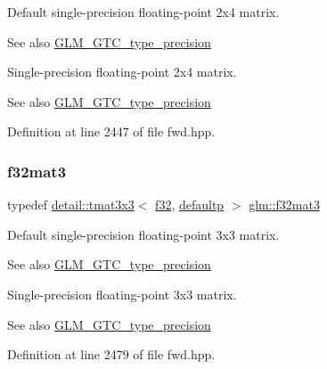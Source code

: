 Default single-\/precision floating-\/point 2x4 matrix. \begin{DoxySeeAlso}{See also}
\hyperlink{group__gtc__type__precision}{G\+L\+M\+\_\+\+G\+T\+C\+\_\+type\+\_\+precision}
\end{DoxySeeAlso}
Single-\/precision floating-\/point 2x4 matrix. \begin{DoxySeeAlso}{See also}
\hyperlink{group__gtc__type__precision}{G\+L\+M\+\_\+\+G\+T\+C\+\_\+type\+\_\+precision} 
\end{DoxySeeAlso}


Definition at line 2447 of file fwd.\+hpp.

\mbox{\label{group__gtc__type__precision_gaf8d666dea6f652c21f0c1515ce522090}} 
\subsubsection{\texorpdfstring{f32mat3}{f32mat3}}
{\footnotesize\ttfamily typedef \hyperlink{structglm_1_1detail_1_1tmat3x3}{detail\+::tmat3x3}$<$ \hyperlink{group__gtc__type__precision_ga0ec999b57f5330d9021256e96038df04}{f32}, \hyperlink{namespaceglm_a0f04f086094c747d227af4425893f545a9d21ccd8b5a009ec7eb7677befc3bf51}{defaultp} $>$ \hyperlink{group__gtc__type__precision_gaf8d666dea6f652c21f0c1515ce522090}{glm\+::f32mat3}}

Default single-\/precision floating-\/point 3x3 matrix. \begin{DoxySeeAlso}{See also}
\hyperlink{group__gtc__type__precision}{G\+L\+M\+\_\+\+G\+T\+C\+\_\+type\+\_\+precision}
\end{DoxySeeAlso}
Single-\/precision floating-\/point 3x3 matrix. \begin{DoxySeeAlso}{See also}
\hyperlink{group__gtc__type__precision}{G\+L\+M\+\_\+\+G\+T\+C\+\_\+type\+\_\+precision} 
\end{DoxySeeAlso}


Definition at line 2479 of file fwd.\+hpp.

\mbox{\label{group__gtc__type__precision_ga43fa9ba1875db74cba2cea33321a77ff}} 
